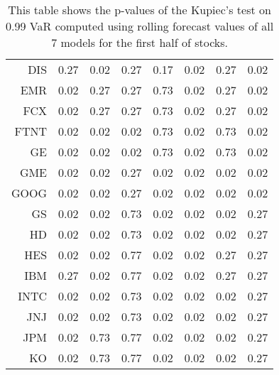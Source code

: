 \begin{table}[ht]
\begin{tabular}{rrrrrrrr}
  DIS & 0.27 & 0.02 & 0.27 & 0.17 & 0.02 & 0.27 & 0.02 \\ 
  EMR & 0.02 & 0.27 & 0.27 & 0.73 & 0.02 & 0.27 & 0.02 \\ 
  FCX & 0.02 & 0.27 & 0.27 & 0.73 & 0.02 & 0.27 & 0.02 \\ 
  FTNT & 0.02 & 0.02 & 0.02 & 0.73 & 0.02 & 0.73 & 0.02 \\ 
  GE & 0.02 & 0.02 & 0.02 & 0.73 & 0.02 & 0.73 & 0.02 \\ 
  GME & 0.02 & 0.02 & 0.27 & 0.02 & 0.02 & 0.02 & 0.02 \\ 
  GOOG & 0.02 & 0.02 & 0.27 & 0.02 & 0.02 & 0.02 & 0.02 \\ 
  GS & 0.02 & 0.02 & 0.73 & 0.02 & 0.02 & 0.02 & 0.27 \\ 
  HD & 0.02 & 0.02 & 0.73 & 0.02 & 0.02 & 0.02 & 0.27 \\ 
  HES & 0.02 & 0.02 & 0.77 & 0.02 & 0.02 & 0.27 & 0.27 \\ 
  IBM & 0.27 & 0.02 & 0.77 & 0.02 & 0.02 & 0.27 & 0.27 \\ 
  INTC & 0.02 & 0.02 & 0.73 & 0.02 & 0.02 & 0.02 & 0.27 \\ 
  JNJ & 0.02 & 0.02 & 0.73 & 0.02 & 0.02 & 0.02 & 0.27 \\ 
  JPM & 0.02 & 0.73 & 0.77 & 0.02 & 0.02 & 0.02 & 0.27 \\ 
  KO & 0.02 & 0.73 & 0.77 & 0.02 & 0.02 & 0.02 & 0.27 \\ 
   \hline
\end{tabular}
\caption[Kupiec's test p-values, alpha =0.99 (1)]{This table shows the p-values of the Kupiec's test on 0.99 VaR computed using rolling forecast values of all 7 models for the first half of stocks.} 
\label{Table:Kupiec_test_rolling_0.99_1}
\end{table}
